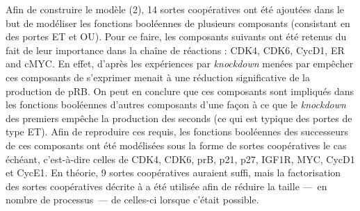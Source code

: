 Afin de construire le modèle (2), 14 sortes coopératives ont été ajoutées dans le but de
modéliser les fonctions booléennes de plusieurs composants (consistant en des portes ET et OU).
Pour ce faire, les composants suivants ont été retenus du fait de leur importance dans la
chaîne de réactions : CDK4, CDK6, CycD1, ER\nbd \textalpha{} and c\nbd MYC.
En effet, d'après les expériences par \textit{knockdown} menées par 
empêcher ces composants de s'exprimer menait à une réduction significative de la production
de pRB.
On peut en conclure que ces composants sont impliqués dans les fonctions booléennes
d'autres composants d'une façon à ce que le \textit{knockdown} des premiers
empêche la production des seconds (ce qui est typique des portes de type ET).
Afin de reproduire ces requis, les fonctions booléennes des successeurs de ces composants
ont été modélisées sous la forme de sortes coopératives le cas échéant, c'est-à-dire celles de
CDK4, CDK6, prB, p21, p27, IGF1R, MYC, CycD1 et CycE1.
En théorie, 9 sortes coopératives auraient suffi, mais la factorisation des sortes coopératives
décrite à \storef a été utilisée afin de réduire la taille ---~en nombre de processus~---
de celles-ci lorsque c'était possible.

\TODO

